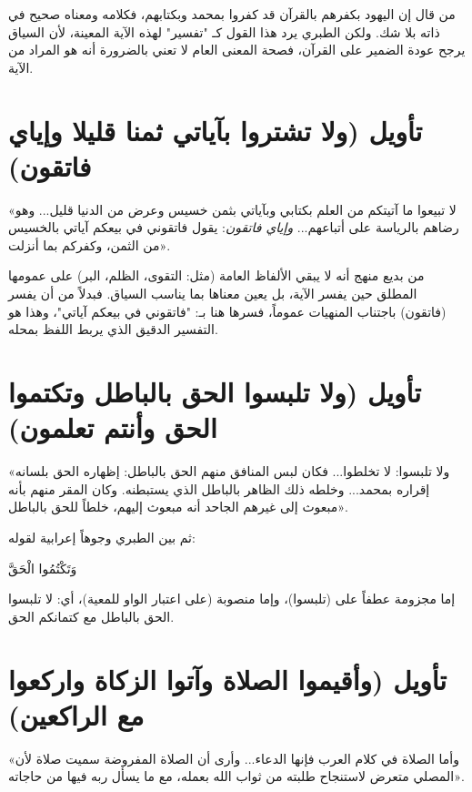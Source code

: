 \begin{fawaid}
من قال إن اليهود بكفرهم بالقرآن قد كفروا بمحمد وبكتابهم، فكلامه ومعناه صحيح في ذاته بلا شك. ولكن الطبري يرد هذا القول كـ "تفسير" لهذه الآية المعينة، لأن السياق يرجح عودة الضمير على القرآن، فصحة المعنى العام لا تعني بالضرورة أنه هو المراد من الآية.
\end{fawaid}

\separator

\section{تأويل (ولا تشتروا بآياتي ثمنا قليلا وإياي فاتقون)}
 «لا تبيعوا ما آتيتكم من العلم بكتابي وبآياتي بثمن خسيس وعرض من الدنيا قليل... وهو رضاهم بالرياسة على أتباعهم... \textit{وإياي فاتقون}: يقول فاتقوني في بيعكم آياتي بالخسيس من الثمن، وكفركم بما أنزلت».

\begin{fawaid}
من بديع منهج  أنه لا يبقي الألفاظ العامة (مثل: التقوى، الظلم، البر) على عمومها المطلق حين يفسر الآية، بل يعين معناها بما يناسب السياق. فبدلاً من أن يفسر (فاتقون) باجتناب المنهيات عموماً، فسرها هنا بـ: "فاتقوني في بيعكم آياتي"، وهذا هو التفسير الدقيق الذي يربط اللفظ بمحله.
\end{fawaid}

\separator

\section{تأويل (ولا تلبسوا الحق بالباطل وتكتموا الحق وأنتم تعلمون)}
 «ولا تلبسوا: لا تخلطوا... فكان لبس المنافق منهم الحق بالباطل: إظهاره الحق بلسانه إقراره بمحمد... وخلطه ذلك الظاهر بالباطل الذي يستبطنه. وكان المقر منهم بأنه مبعوث إلى غيرهم الجاحد أنه مبعوث إليهم، خلطاً للحق بالباطل».

ثم بين الطبري وجوهاً إعرابية لقوله: \begin{ayah}وَتَكْتُمُوا الْحَقَّ\end{ayah} إما مجزومة عطفاً على (تلبسوا)، وإما منصوبة (على اعتبار الواو للمعية)، أي: لا تلبسوا الحق بالباطل مع كتمانكم الحق.

\separator

\section{تأويل (وأقيموا الصلاة وآتوا الزكاة واركعوا مع الراكعين)}
 «وأما الصلاة في كلام العرب فإنها الدعاء... وأرى أن الصلاة المفروضة سميت صلاة لأن المصلي متعرض لاستنجاح طلبته من ثواب الله بعمله، مع ما يسأل ربه فيها من حاجاته».

